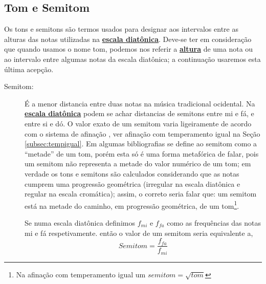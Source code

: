 \subsection{Tom e Semitom}
\label{subsec:tomesemitom}

Os tons e semitons são termos usados para designar aos intervalos entre as alturas das notas utilizadas na 
\hyperref[sec:pos:Diatonica]{\textbf{escala diatônica}}.
Deve-se ter em consideração que quando usamos o nome tom,
podemos nos referir a \hyperref[sec:pos:Altura]{\textbf{altura}} 
de uma nota ou ao intervalo entre algumas notas da escala diatônica;
a continuação usaremos esta última acepção.

\begin{description}

\item [Semitom:] \label{sec:pos:Semitom}
É a menor distancia entre duas notas na música tradicional ocidental.
Na \hyperref[sec:pos:Diatonica]{\textbf{escala diatônica}} 
podem se achar distancias de semitons entre mi e fá, e entre si e dó.
O valor exato de um semitom varia ligeiramente de acordo com o sistema de afinação \cite[pp. 30]{cardoso1973curso}\cite[pp. 762]{apel1969harvard}, ver afinação com temperamento igual na Seção \ref{subsec:tempigual}. 
Em algumas bibliografias se define ao semitom como a ``metade'' de um tom, 
porém esta só é uma forma metafórica de falar, 
pois um semitom não representa a metade do valor numérico de um tom;
em verdade os tons e semitons são calculados considerando que as notas cumprem uma progressão geométrica
(irregular na escala diatônica e regular na escala cromática);
assim, o correto seria falar que: um semitom está na metade do caminho, em progressão geométrica, de um tom\footnote{Na 
afinação com temperamento igual um $semitom=\sqrt{tom}$}.
\begin{example}
Se numa escala diatônica definimos $f_{mi}$ e $f_{fa}$ como as frequências das notas mi e fá respetivamente.
então o valor de um semitom seria equivalente a,
\begin{equation*}
Semitom=\frac{f_{fa}}{f_{mi}}
\end{equation*}
\end{example}


\end{description}
